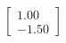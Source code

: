 \documentclass[preview]{standalone}
\begin{document}
\begin{align*}
\begin{bmatrix} 1.00 \\ -1.50 \end{bmatrix}
\end{align*}
\end{document}
